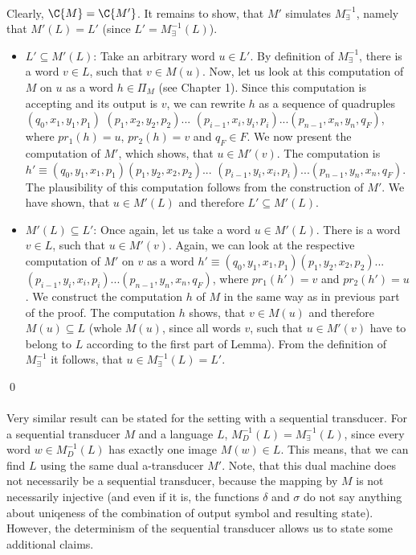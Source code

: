 \paragraph{}
Clearly, $\C{M} = \C{M'}$. It remains to show, that $M'$ simulates $M_{\exists}^{-1}$, namely that $M'(L) = L'$ (since $L' = M_{\exists}^{-1}(L)$).
\begin{itemize}
\item $L' \subseteq M'(L)$: Take an arbitrary word $u \in L'$. By definition of $M_{\exists}^{-1}$, there is a word $v \in L$, such that $v \in M(u)$. Now, let us look at this computation of $M$ on $u$ as a word $h \in \Pi_M$ (see Chapter 1). Since this computation is accepting and its output is $v$, we can rewrite $h$ as a sequence of quadruples $(q_0, x_1, y_1, p_1)$ $(p_1,x_2,y_2,p_2)...$ $(p_{i-1},x_i,y_i,p_i)...$$(p_{n-1},x_n,y_n,q_F)$, where $pr_1(h) = u$, $pr_2(h) = v$ and $q_F \in F$. We now present the computation of $M'$, which shows, that $u \in M'(v)$. The computation is $h' \equiv (q_0, y_1, x_1, p_1)$$(p_1,y_2,x_2,p_2)...$ $(p_{i-1},y_i,x_i,p_i)...$$(p_{n-1},y_n,x_n,q_F)$. The plausibility of this computation follows from the construction of $M'$. We have shown, that $u \in M'(L)$ and therefore $L' \subseteq M'(L)$.
\item $M'(L) \subseteq L'$: Once again, let us take a word $u \in M'(L)$. There is a word $v \in L$, such that $u \in M'(v)$. Again, we can look at the respective computation of $M'$ on $v$ as a word $h' \equiv (q_0, y_1, x_1, p_1)$$(p_1,y_2,x_2,p_2)...$ $(p_{i-1},y_i,x_i,p_i)...$$(p_{n-1},y_n,x_n,q_F)$, where $pr_1(h') = v$ and $pr_2(h') = u$. We construct the computation $h$ of $M$ in the same way as in previous part of the proof. The computation $h$ shows, that $v \in M(u)$ and therefore $M(u) \subseteq L$ (whole $M(u)$, since all words $v$, such that $u \in M'(v)$ have to belong to $L$ according to the first part of Lemma). From the definition of $M_{\exists}^{-1}$ it follows, that $u \in M_{\exists}^{-1}(L) = L'$.
\end{itemize} \qed

\paragraph{}
Very similar result can be stated for the setting with a sequential transducer. For a sequential transducer $M$ and a language $L$, $M_{D}^{-1}(L) = M_{\exists}^{-1}(L)$, since every word $w \in M^{-1}_{D}(L)$ has exactly one image $M(w) \in L$. This means, that we can find $L$ using the same dual a-transducer $M'$. Note, that this dual machine does not necessarily be a sequential transducer, because the mapping by $M$ is not necessarily injective (and even if it is, the functions $\delta$ and $\sigma$ do not say anything about uniqeness of the combination of output symbol and resulting state). However, the determinism of the sequential transducer allows us to state some additional claims.

